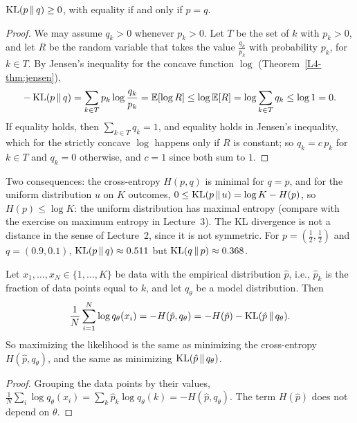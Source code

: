 \begin{theorem}\label{L4-thm:gibbs}
    $\operatorname{KL}(p \,\|\, q) \geq 0$, with equality if and only if $p = q$.
\end{theorem}

\begin{proof}
    We may assume $q_k > 0$ whenever $p_k > 0$. Let $T$ be the set of $k$ with $p_k > 0$, and let $R$ be the random variable that takes the value $\frac{q_k}{p_k}$ with probability $p_k$, for $k \in T$. By Jensen's inequality for the concave function $\log$ (Theorem~\ref{L4-thm:jensen}),
    \[-\operatorname{KL}(p \,\|\, q) = \sum_{k \in T} p_k\log\frac{q_k}{p_k} = \mathbb{E}[\log R] \leq \log\mathbb{E}[R] = \log\sum_{k \in T} q_k \leq \log 1 = 0.\]
    If equality holds, then $\sum_{k \in T} q_k = 1$, and equality holds in Jensen's inequality, which for the strictly concave $\log$ happens only if $R$ is constant; so $q_k = c\,p_k$ for $k \in T$ and $q_k = 0$ otherwise, and $c = 1$ since both sum to $1$.
\end{proof}

Two consequences: the cross-entropy $H(p, q)$ is minimal for $q = p$, and for the uniform distribution $u$ on $K$ outcomes, $0 \leq \operatorname{KL}(p \,\|\, u) = \log K - H(p)$, so $H(p) \leq \log K$: the uniform distribution has maximal entropy (compare with the exercise on maximum entropy in Lecture~3). The KL divergence is not a distance in the sense of Lecture~2, since it is not symmetric. For $p = (\frac{1}{2}, \frac{1}{2})$ and $q = (0.9, 0.1)$, $\operatorname{KL}(p \,\|\, q) \approx 0.511$ but $\operatorname{KL}(q \,\|\, p) \approx 0.368$.

\begin{theorem}\label{L4-thm:mle-kl}
    Let $x_1, \ldots, x_N \in \{1, \ldots, K\}$ be data with the empirical distribution $\hat p$, i.e., $\hat p_k$ is the fraction of data points equal to $k$, and let $q_\theta$ be a model distribution. Then
    \[\frac{1}{N}\sum_{i=1}^N \log q_\theta(x_i) = -H(\hat p, q_\theta) = -H(\hat p) - \operatorname{KL}(\hat p \,\|\, q_\theta).\]
    So maximizing the likelihood is the same as minimizing the cross-entropy $H(\hat p, q_\theta)$, and the same as minimizing $\operatorname{KL}(\hat p \,\|\, q_\theta)$.
\end{theorem}

\begin{proof}
    Grouping the data points by their values, $\frac{1}{N}\sum_i \log q_\theta(x_i) = \sum_k \hat p_k\log q_\theta(k) = -H(\hat p, q_\theta)$. The term $H(\hat p)$ does not depend on $\theta$.
\end{proof}

